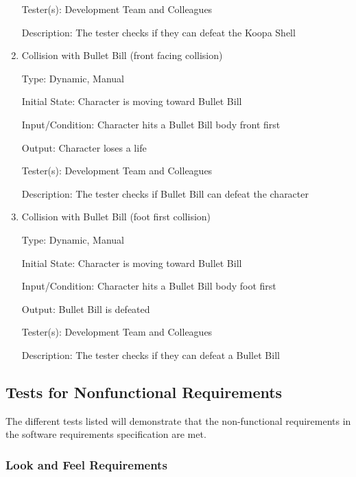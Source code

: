 \documentclass[12pt, titlepage]{article}
\begin{document}
\begin{enumerate}
Tester(s): Development Team and Colleagues

Description: The tester checks if they can defeat the Koopa Shell



\item{Collision with Bullet Bill (front facing collision)\\}

Type: Dynamic, Manual

Initial State: Character is moving toward Bullet Bill

Input/Condition: Character hits a Bullet Bill body front first

Output: Character loses a life

Tester(s): Development Team and Colleagues

Description: The tester checks if Bullet Bill can defeat the character



\item{Collision with Bullet Bill (foot first collision)\\}

Type: Dynamic, Manual

Initial State: Character is moving toward Bullet Bill

Input/Condition: Character hits a Bullet Bill body foot first

Output: Bullet Bill is defeated

Tester(s): Development Team and Colleagues

Description: The tester checks if they can defeat a Bullet Bill

\end{enumerate}

\subsection{Tests for Nonfunctional Requirements}
The different tests listed will demonstrate that the non-functional requirements in the software requirements specification are met.

\subsubsection{Look and Feel Requirements}
\end{document}
